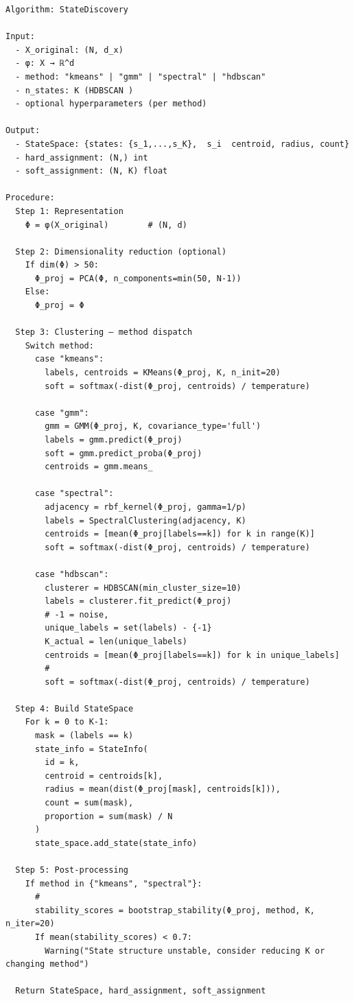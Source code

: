 \documentclass[
  12pt,
]{article}
\begin{document}
\begin{verbatim}
Algorithm: StateDiscovery

Input:
  - X_original: (N, d_x) 
  - φ: X → ℝ^d 
  - method: "kmeans" | "gmm" | "spectral" | "hdbscan"
  - n_states: K (HDBSCAN )
  - optional hyperparameters (per method)

Output:
  - StateSpace: {states: {s_1,...,s_K},  s_i  centroid, radius, count}
  - hard_assignment: (N,) int 
  - soft_assignment: (N, K) float 

Procedure:
  Step 1: Representation
    Φ = φ(X_original)        # (N, d) 

  Step 2: Dimensionality reduction (optional)
    If dim(Φ) > 50:
      Φ_proj = PCA(Φ, n_components=min(50, N-1))
    Else:
      Φ_proj = Φ

  Step 3: Clustering — method dispatch
    Switch method:
      case "kmeans":
        labels, centroids = KMeans(Φ_proj, K, n_init=20)
        soft = softmax(-dist(Φ_proj, centroids) / temperature)

      case "gmm":
        gmm = GMM(Φ_proj, K, covariance_type='full')
        labels = gmm.predict(Φ_proj)
        soft = gmm.predict_proba(Φ_proj)
        centroids = gmm.means_

      case "spectral":
        adjacency = rbf_kernel(Φ_proj, gamma=1/p)
        labels = SpectralClustering(adjacency, K)
        centroids = [mean(Φ_proj[labels==k]) for k in range(K)]
        soft = softmax(-dist(Φ_proj, centroids) / temperature)

      case "hdbscan":
        clusterer = HDBSCAN(min_cluster_size=10)
        labels = clusterer.fit_predict(Φ_proj)
        # -1 = noise, 
        unique_labels = set(labels) - {-1}
        K_actual = len(unique_labels)
        centroids = [mean(Φ_proj[labels==k]) for k in unique_labels]
        # 
        soft = softmax(-dist(Φ_proj, centroids) / temperature)

  Step 4: Build StateSpace
    For k = 0 to K-1:
      mask = (labels == k)
      state_info = StateInfo(
        id = k,
        centroid = centroids[k],
        radius = mean(dist(Φ_proj[mask], centroids[k])),
        count = sum(mask),
        proportion = sum(mask) / N
      )
      state_space.add_state(state_info)

  Step 5: Post-processing
    If method in {"kmeans", "spectral"}:
      # 
      stability_scores = bootstrap_stability(Φ_proj, method, K, n_iter=20)
      If mean(stability_scores) < 0.7:
        Warning("State structure unstable, consider reducing K or changing method")

  Return StateSpace, hard_assignment, soft_assignment
\end{verbatim}
\end{document}
